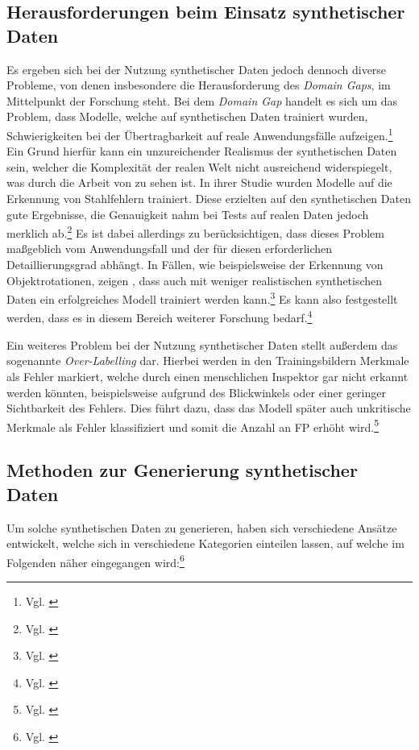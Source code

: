 \subsection{Herausforderungen beim Einsatz synthetischer Daten}
Es ergeben sich bei der Nutzung synthetischer Daten jedoch dennoch diverse Probleme, von denen insbesondere die Herausforderung des \textit{Domain Gaps}, im Mittelpunkt der Forschung steht. Bei dem \textit{Domain Gap} handelt es sich um das Problem, dass Modelle, welche auf synthetischen Daten trainiert wurden, Schwierigkeiten bei der Übertragbarkeit auf reale Anwendungsfälle aufzeigen.\footnote{Vgl. \cite[S. 768]{monnet_investigating_2024}} Ein Grund hierfür kann ein unzureichender Realismus der synthetischen Daten sein, welcher die Komplexität der realen Welt nicht ausreichend widerspiegelt, was durch die Arbeit von \cite{boikov_synthetic_2021} zu sehen ist. In ihrer Studie wurden Modelle auf die Erkennung von Stahlfehlern trainiert. Diese erzielten auf den synthetischen Daten gute Ergebnisse, die Genauigkeit nahm bei Tests auf realen Daten jedoch merklich ab.\footnote{Vgl. \cite[S. 8]{boikov_synthetic_2021}} Es ist dabei allerdings zu berücksichtigen, dass dieses Problem maßgeblich vom Anwendungsfall und der für diesen erforderlichen Detaillierungsgrad abhängt. In Fällen, wie beispielsweise der Erkennung von Objektrotationen, zeigen \cite{manettas_synthetic_2021}, dass auch mit weniger realistischen synthetischen Daten ein erfolgreiches Modell trainiert werden kann.\footnote{Vgl. \cite[S. 241 f.]{manettas_synthetic_2021}} 
Es kann also festgestellt werden, dass es in diesem Bereich weiterer Forschung bedarf.\footnote{Vgl. \cite[S. 772]{monnet_investigating_2024}}

Ein weiteres Problem bei der Nutzung synthetischer Daten stellt außerdem das sogenannte \textit{Over-Labelling} dar. Hierbei werden in den Trainingsbildern Merkmale als Fehler markiert, welche durch einen menschlichen Inspektor gar nicht erkannt werden könnten, beispielsweise aufgrund des Blickwinkels oder einer geringer Sichtbarkeit des Fehlers. Dies führt dazu, dass das Modell später auch unkritische Merkmale als Fehler klassifiziert und somit die Anzahl an \ac{FP} erhöht wird.\footnote{Vgl. \cite[S. 4431]{fulir_synthetic_2023}}

\subsection{Methoden zur Generierung synthetischer Daten}
Um solche synthetischen Daten zu generieren, haben sich verschiedene Ansätze entwickelt, welche sich in verschiedene Kategorien einteilen lassen, auf welche im Folgenden näher eingegangen wird:\footnote{Vgl. \cite[S. 4426 f.]{fulir_synthetic_2023}}


